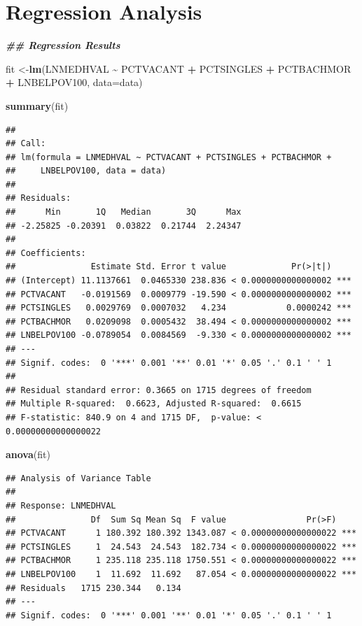 \documentclass[
]{article}
\newenvironment{Shaded}{\begin{snugshade}}{\end{snugshade}}
\newcommand{\AttributeTok}[1]{\textcolor[rgb]{0.13,0.29,0.53}{#1}}
\newcommand{\DocumentationTok}[1]{\textcolor[rgb]{0.56,0.35,0.01}{\textbf{\textit{#1}}}}
\newcommand{\FunctionTok}[1]{\textcolor[rgb]{0.13,0.29,0.53}{\textbf{#1}}}
\newcommand{\NormalTok}[1]{#1}
\newcommand{\OtherTok}[1]{\textcolor[rgb]{0.56,0.35,0.01}{#1}}
\newcommand{\SpecialCharTok}[1]{\textcolor[rgb]{0.81,0.36,0.00}{\textbf{#1}}}
\begin{document}
\hypertarget{regression-analysis}{%
\section{Regression Analysis}\label{regression-analysis}}

\begin{Shaded}
\begin{Highlighting}[]
\DocumentationTok{\#\# Regression Results}

\NormalTok{fit }\OtherTok{\textless{}{-}}\FunctionTok{lm}\NormalTok{(LNMEDHVAL }\SpecialCharTok{\textasciitilde{}}\NormalTok{  PCTVACANT }\SpecialCharTok{+}\NormalTok{ PCTSINGLES }\SpecialCharTok{+}\NormalTok{ PCTBACHMOR }\SpecialCharTok{+}\NormalTok{ LNBELPOV100, }\AttributeTok{data=}\NormalTok{data)}

\FunctionTok{summary}\NormalTok{(fit)}
\end{Highlighting}
\end{Shaded}

\begin{verbatim}
## 
## Call:
## lm(formula = LNMEDHVAL ~ PCTVACANT + PCTSINGLES + PCTBACHMOR + 
##     LNBELPOV100, data = data)
## 
## Residuals:
##      Min       1Q   Median       3Q      Max 
## -2.25825 -0.20391  0.03822  0.21744  2.24347 
## 
## Coefficients:
##               Estimate Std. Error t value             Pr(>|t|)    
## (Intercept) 11.1137661  0.0465330 238.836 < 0.0000000000000002 ***
## PCTVACANT   -0.0191569  0.0009779 -19.590 < 0.0000000000000002 ***
## PCTSINGLES   0.0029769  0.0007032   4.234            0.0000242 ***
## PCTBACHMOR   0.0209098  0.0005432  38.494 < 0.0000000000000002 ***
## LNBELPOV100 -0.0789054  0.0084569  -9.330 < 0.0000000000000002 ***
## ---
## Signif. codes:  0 '***' 0.001 '**' 0.01 '*' 0.05 '.' 0.1 ' ' 1
## 
## Residual standard error: 0.3665 on 1715 degrees of freedom
## Multiple R-squared:  0.6623, Adjusted R-squared:  0.6615 
## F-statistic: 840.9 on 4 and 1715 DF,  p-value: < 0.00000000000000022
\end{verbatim}

\begin{Shaded}
\begin{Highlighting}[]
\FunctionTok{anova}\NormalTok{(fit)}
\end{Highlighting}
\end{Shaded}

\begin{verbatim}
## Analysis of Variance Table
## 
## Response: LNMEDHVAL
##               Df  Sum Sq Mean Sq  F value                Pr(>F)    
## PCTVACANT      1 180.392 180.392 1343.087 < 0.00000000000000022 ***
## PCTSINGLES     1  24.543  24.543  182.734 < 0.00000000000000022 ***
## PCTBACHMOR     1 235.118 235.118 1750.551 < 0.00000000000000022 ***
## LNBELPOV100    1  11.692  11.692   87.054 < 0.00000000000000022 ***
## Residuals   1715 230.344   0.134                                   
## ---
## Signif. codes:  0 '***' 0.001 '**' 0.01 '*' 0.05 '.' 0.1 ' ' 1
\end{verbatim}
\end{document}
